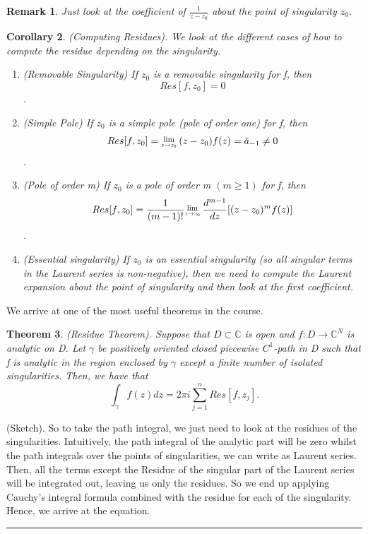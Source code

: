 \documentclass[twoside]{article}
\newcounter{lecnum}
\newcommand{\Lim}[1]{\raisebox{0.5ex}{\scalebox{0.8}{$\displaystyle \lim_{#1}\;$}}}
\newtheorem{theorem}{Theorem}[lecnum]
\newtheorem{remark}[theorem]{Remark}
\newtheorem{corollary}[theorem]{Corollary}
\newenvironment{proof}{{\bf Proof:}}{\hfill\rule{2mm}{2mm}}
\begin{document}
\begin{remark} Just look at the coefficient of $\frac{1}{z - z_0}$ about the point of singularity $z_0$.
\end{remark}

\begin{corollary}(Computing Residues). We look at the different cases of how to compute the residue depending on the singularity.

\begin{enumerate}
\item (Removable Singularity) If $z_0$ is a removable singularity for f, then $$Res[f, z_0] = 0$$.

 \item (Simple Pole) If $z_0$ is a simple pole (pole of order one) for f, then $$Res[f, z_0] = \Lim{z \rightarrow z_0}(z - z_0)f(z) = \tilde{a}_{-1} \neq 0$$.

 \item (Pole of order m) If $z_0$ is a pole of order m $(m \geq 1)$ for f, then $$Res[f, z_0] = \frac{1}{(m-1)!}\Lim{z \rightarrow z_0}\frac{d^{m-1}}{dz}[(z - z_0)^mf(z)]$$.

 \item (Essential singularity) If $z_0$ is an essential singularity (so all singular terms in the Laurent series is non-negative), then we need to compute the Laurent expansion about the point of singularity and then look at the first coefficient.
\end{enumerate}
\end{corollary}


We arrive at one of the most useful theorems in the course.
\begin{theorem}(Residue Theorem). Suppose that $D \subset \mathbb{C}$ is open and $f: D \rightarrow \mathbb{C}^N$ is analytic on D. Let $\gamma$ be positively oriented closed piecewise $C^1$-path in D such that f is analytic in the region enclosed by $\gamma$ except a finite number of isolated singularities. Then, we have that 
$$
\int_{\gamma}f(z)dz = 2\pi i\sum_{j=1}^nRes[f,z_j].
$$
\end{theorem}
\begin{proof}(Sketch). So to take the path integral, we just need to look at the residues of the singularities. Intuitively, the path integral of the analytic part will be zero whilst the path integrals over the points of singularities, we can write as Laurent series. Then, all the terms except the Residue of the singular part of the Laurent series will be integrated out, leaving us only the residues. So we end up applying Cauchy's integral formula combined with the residue for each of the singularity. Hence, we arrive at the equation.
\end{proof}
\end{document}
